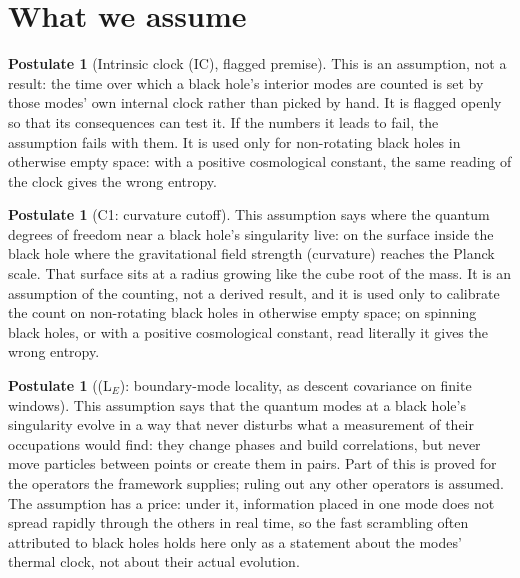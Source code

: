 \documentclass[11pt]{article}
\theoremstyle{definition}
\newtheorem{postulate}[theorem]{Postulate}
\theoremstyle{plain}
\begin{document}
\section{What we assume}

\begin{postulate}[Intrinsic clock (IC), flagged premise]\label{c:scrambling.intrinsic-clock-ic-flagged-premise}
This is an assumption, not a result: the time over which a black hole's interior modes are counted is set by those modes' own internal clock rather than picked by hand. It is flagged openly so that its consequences can test it. If the numbers it leads to fail, the assumption fails with them. It is used only for non-rotating black holes in otherwise empty space: with a positive cosmological constant, the same reading of the clock gives the wrong entropy.
\end{postulate}

\begin{postulate}[C1: curvature cutoff]\label{c:singularity.c1-curvature-cutoff}
This assumption says where the quantum degrees of freedom near a black hole's singularity live: on the surface inside the black hole where the gravitational field strength (curvature) reaches the Planck scale. That surface sits at a radius growing like the cube root of the mass. It is an assumption of the counting, not a derived result, and it is used only to calibrate the count on non-rotating black holes in otherwise empty space; on spinning black holes, or with a positive cosmological constant, read literally it gives the wrong entropy.
\end{postulate}

\begin{postulate}[(L$_E$): boundary-mode locality, as descent covariance on finite windows]\label{c:singularity.l-boundary-mode-locality}
This assumption says that the quantum modes at a black hole's singularity evolve in a way that never disturbs what a measurement of their occupations would find: they change phases and build correlations, but never move particles between points or create them in pairs. Part of this is proved for the operators the framework supplies; ruling out any other operators is assumed. The assumption has a price: under it, information placed in one mode does not spread rapidly through the others in real time, so the fast scrambling often attributed to black holes holds here only as a statement about the modes' thermal clock, not about their actual evolution.
\end{postulate}
\end{document}
